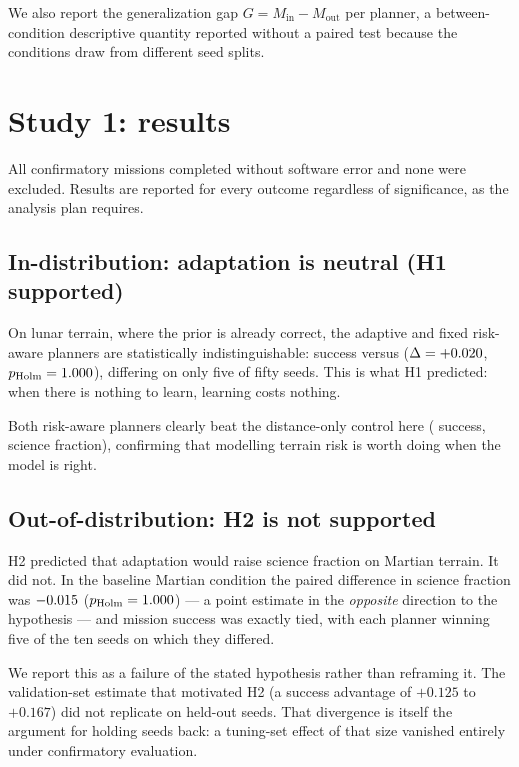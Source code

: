 \documentclass[11pt]{article}
\begin{document}
We also report the generalization gap
$G = M_{\mathrm{in}} - M_{\mathrm{out}}$ per planner, a between-condition
descriptive quantity reported without a paired test because the conditions
draw from different seed splits.

\section{Study 1: results}
\label{sec:results}

All \MainMissions{} confirmatory missions completed without software error and
none were excluded. Results are reported for every outcome regardless of
significance, as the analysis plan requires.

\subsection{In-distribution: adaptation is neutral (H1 supported)}

On lunar terrain, where the prior is already correct, the adaptive and fixed
risk-aware planners are statistically indistinguishable: success
\MainMoonIDAdaptiveSuccess{} versus \MainMoonIDFixedSuccess{}
($\Delta = +0.020$, $p_{\mathrm{Holm}} = 1.000$),
differing on only five of fifty seeds. This is what H1 predicted: when there is
nothing to learn, learning costs nothing.

Both risk-aware planners clearly beat the distance-only control here
(\MainMoonIDAstarSuccess{} success, \MainMoonIDAstarScience{} science
fraction), confirming that modelling terrain risk is worth doing when the
model is right.

\subsection{Out-of-distribution: H2 is not supported}

H2 predicted that adaptation would raise science fraction on Martian terrain.
It did not. In the baseline Martian condition the paired difference in science
fraction was $-0.015$
($p_{\mathrm{Holm}} = 1.000$) --- a point estimate in the
\emph{opposite} direction to the hypothesis --- and mission success was exactly
tied, with each planner winning five of the ten seeds on which they differed.

We report this as a failure of the stated hypothesis rather than reframing it.
The validation-set estimate that motivated H2 (a success advantage of $+0.125$
to $+0.167$) did not replicate on held-out seeds. That divergence is itself the
argument for holding seeds back: a tuning-set effect of that size vanished
entirely under confirmatory evaluation.
\end{document}

